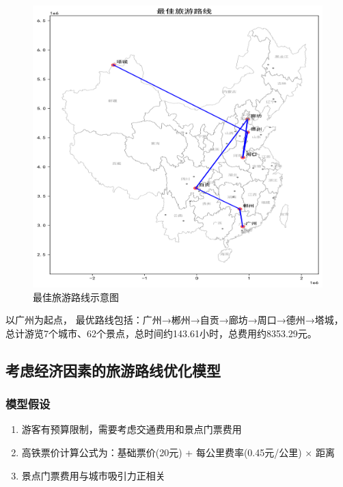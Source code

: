 \documentclass[withoutpreface,bwprint]{cumcmthesis} %
\begin{document}
\begin{figure}[H]
    \centering
    \includegraphics[width=1.0\textwidth]{figures/image/3_optimal_route.png}
    \caption{最佳旅游路线示意图}
    \label{fig:最佳旅游路线示意图}
\end{figure}

以广州为起点，
最优路线包括：广州→郴州→自贡→廊坊→周口→德州→塔城，
总计游览7个城市、62个景点，总时间约143.61小时，总费用约8353.29元。


\subsection{考虑经济因素的旅游路线优化模型}

\subsubsection{模型假设}
\begin{enumerate}
    \item 游客有预算限制，需要考虑交通费用和景点门票费用
    \item 高铁票价计算公式为：基础票价(20元) + 每公里费率(0.45元/公里) × 距离
    \item 景点门票费用与城市吸引力正相关
\end{enumerate}
\end{document}
